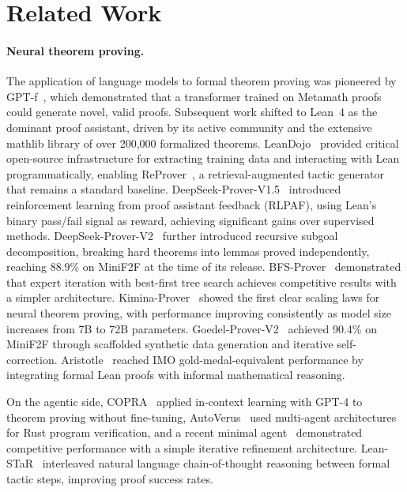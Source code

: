 \documentclass{article}
\begin{document}
\section{Related Work}
\label{sec:related}

\paragraph{Neural theorem proving.}
The application of language models to formal theorem proving was pioneered by GPT-f~\citep{polu2020generative}, which demonstrated that a transformer trained on Metamath proofs could generate novel, valid proofs. Subsequent work shifted to Lean~4 as the dominant proof assistant, driven by its active community and the extensive mathlib library of over 200,000 formalized theorems. LeanDojo~\citep{yang2023leandojo} provided critical open-source infrastructure for extracting training data and interacting with Lean programmatically, enabling ReProver~\citep{yang2023leandojo}, a retrieval-augmented tactic generator that remains a standard baseline. DeepSeek-Prover-V1.5~\citep{xin2024deepseekprover15} introduced reinforcement learning from proof assistant feedback (RLPAF), using Lean's binary pass/fail signal as reward, achieving significant gains over supervised methods. DeepSeek-Prover-V2~\citep{ren2025deepseekv2} further introduced recursive subgoal decomposition, breaking hard theorems into lemmas proved independently, reaching 88.9\% on MiniF2F at the time of its release. BFS-Prover~\citep{xin2025bfsprover} demonstrated that expert iteration with best-first tree search achieves competitive results with a simpler architecture. Kimina-Prover~\citep{wang2025kimina} showed the first clear scaling laws for neural theorem proving, with performance improving consistently as model size increases from 7B to 72B parameters. Goedel-Prover-V2~\citep{lin2025goedelv2} achieved 90.4\% on MiniF2F through scaffolded synthetic data generation and iterative self-correction. Aristotle~\citep{achim2025aristotle} reached IMO gold-medal-equivalent performance by integrating formal Lean proofs with informal mathematical reasoning.

On the agentic side, COPRA~\citep{thakur2024copra} applied in-context learning with GPT-4 to theorem proving without fine-tuning, AutoVerus~\citep{yang2025autoverus} used multi-agent architectures for Rust program verification, and a recent minimal agent~\citep{requena2026minimal} demonstrated competitive performance with a simple iterative refinement architecture. Lean-STaR~\citep{lin2024leanstar} interleaved natural language chain-of-thought reasoning between formal tactic steps, improving proof success rates.
\end{document}
